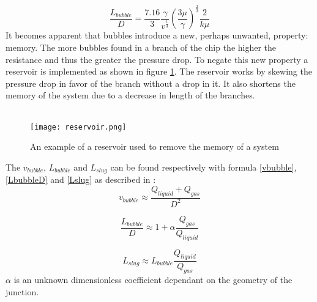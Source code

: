 \begin{equation}
\frac{L_{bubble}}{D} = \frac{7.16}{3} \frac{\gamma}{v^{\frac{1}{3}}}{\left(\frac{3\mu}{\gamma}\right)}^{\frac{2}{3}}\frac{2}{k\mu}
\label{Lcritical}
\end{equation}
It becomes apparent that bubbles introduce a new, perhaps unwanted, property: memory. The more bubbles found in a branch of the chip the higher the resistance and thus the greater the pressure drop. To negate this new property a reservoir is implemented as shown in figure \ref{fig:reservoir}. The reservoir works by skewing the pressure drop in favor of the branch without a drop in it. It also shortens the memory of the system due to a decrease in length of the branches.\\
\\
\begin{figure}[ht]
\centering
\texttt{[image: reservoir.png]}
\caption{An example of a reservoir used to remove the memory of a system \cite{handout}}
\label{fig:reservoir}
\end{figure}
The $v_{bubble}$, $L_{bubble}$ and $L_{slug}$ can be found respectively with formula \ref{vbubble}, \ref{LbubbleD} and \ref{Lslug} as described in \cite{handout}:
\begin{equation}
v_{bubble}\approx \frac{Q_{liquid}+Q_{gas}}{D^2}
\label{vbubble}
\end{equation}

\begin{equation}
\frac{L_{bubble}}{D} \approx 1 + \alpha\frac{Q_{gas}}{Q_{liquid}}
\label{LbubbleD}
\end{equation}

\begin{equation}
\label{Lslug}
L_{slug} \approx L_{bubble}\frac{Q_{liquid}}{Q_{gas}}
\end{equation}
$\alpha$ is an unknown dimensionless coefficient dependant on the geometry of the junction.